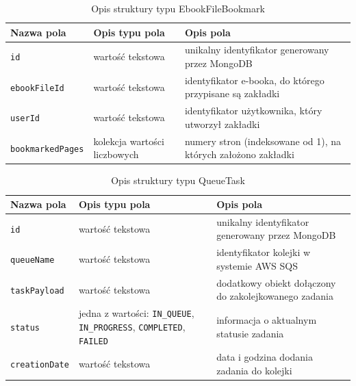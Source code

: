 \begin{table}
    \caption{Opis struktury typu EbookFileBookmark}
    \renewcommand{\arraystretch}{1.3} %
    \centering
    \begin{tabular}{|>{\centering\arraybackslash}m{4.7cm}|>{\centering\arraybackslash}m{4.7cm}|>{\centering\arraybackslash}m{4.7cm}|} \hline
        \textbf{Nazwa pola} & \textbf{Opis typu pola} & \textbf{Opis pola} \\ \hline
        \verb|id| & wartość tekstowa & unikalny identyfikator generowany przez MongoDB \\ \hline
        \verb|ebookFileId| & wartość tekstowa & identyfikator e-booka, do którego przypisane są zakładki \\ \hline
        \verb|userId| & wartość tekstowa & identyfikator użytkownika, który utworzył zakładki  \\ \hline
        \verb|bookmarkedPages| & kolekcja wartości liczbowych & numery stron (indeksowane od 1), na których założono zakładki \\ \hline
    \end{tabular}
    \label{tab:ebook_file_bookmark_db_struct}
\end{table}

\begin{table}
    \caption{Opis struktury typu QueueTask}
    \renewcommand{\arraystretch}{1.3} %
    \centering
    \begin{tabular}{|>{\centering\arraybackslash}m{4.7cm}|>{\centering\arraybackslash}m{4.7cm}|>{\centering\arraybackslash}m{4.7cm}|} \hline
        \textbf{Nazwa pola} & \textbf{Opis typu pola} & \textbf{Opis pola} \\ \hline
        \verb|id| & wartość tekstowa & unikalny identyfikator generowany przez MongoDB \\ \hline
        \verb|queueName| & wartość tekstowa & identyfikator kolejki w systemie AWS SQS \\ \hline
        \verb|taskPayload| & wartość tekstowa & dodatkowy obiekt dołączony do zakolejkowanego zadania  \\ \hline
        \verb|status| & jedna z wartości: \verb|IN_QUEUE|, \verb|IN_PROGRESS|, \verb|COMPLETED|, \verb|FAILED| & informacja o aktualnym statusie zadania \\ \hline
        \verb|creationDate| & wartość tekstowa & data i godzina dodania zadania do kolejki \\ \hline
    \end{tabular}
    \label{tab:queue_task_db_struct}
\end{table}

